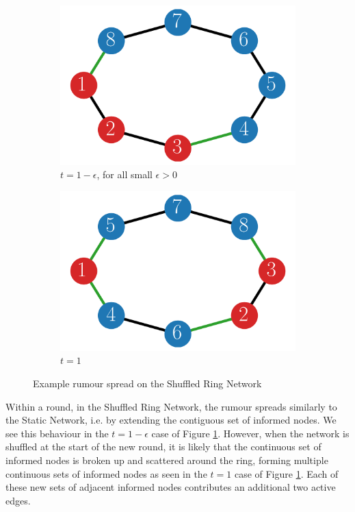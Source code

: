 \begin{figure}[h]
	\centering
    \begin{subfigure}[b]{0.49\textwidth}
		\centering
		\includegraphics[width=\textwidth]{./figures/static_ring_example_spread.png}
		\caption*{$t=1 - \epsilon$, for all small $\epsilon > 0$}
	\end{subfigure}
	\begin{subfigure}[b]{0.49\textwidth}
		\centering
		\includegraphics[width=\textwidth]{./figures/shuffled_ring_example_spread.png}
		\caption*{$t=1$}
	\end{subfigure}
	\caption{Example rumour spread on the Shuffled Ring Network}
	\label{fig:shuffledRingExampleSpread}
\end{figure}

Within a round, in the Shuffled Ring Network, the rumour spreads similarly to the Static Network, i.e. by extending the contiguous set of informed nodes. We see this behaviour in the $t = 1 - \epsilon$ case of Figure \ref{fig:shuffledRingExampleSpread}. However, when the network is shuffled at the start of the new round, it is likely that the continuous set of informed nodes is broken up and scattered around the ring, forming multiple continuous sets of informed nodes as seen in the $t=1$ case of Figure \ref{fig:shuffledRingExampleSpread}. Each of these new sets of adjacent informed nodes contributes an additional two active edges.

